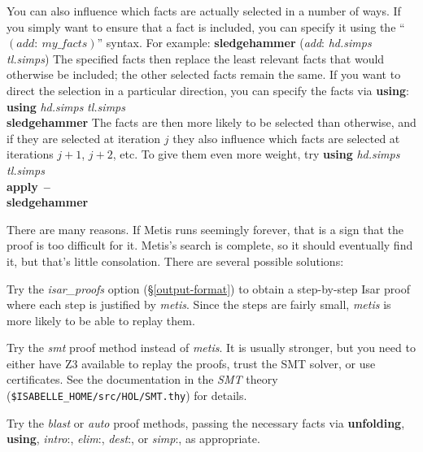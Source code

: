 \documentclass[a4paper,12pt]{article}
\begin{document}
You can also influence which facts are actually selected in a number of ways. If
you simply want to ensure that a fact is included, you can specify it using the
``$(\textit{add}{:}~\textit{my\_facts})$'' syntax. For example:
%
\prew
\textbf{sledgehammer} (\textit{add}: \textit{hd.simps} \textit{tl.simps})
\postw
%
The specified facts then replace the least relevant facts that would otherwise be
included; the other selected facts remain the same.
If you want to direct the selection in a particular direction, you can specify
the facts via \textbf{using}:
%
\prew
\textbf{using} \textit{hd.simps} \textit{tl.simps} \\
\textbf{sledgehammer}
\postw
%
The facts are then more likely to be selected than otherwise, and if they are
selected at iteration $j$ they also influence which facts are selected at
iterations $j + 1$, $j + 2$, etc. To give them even more weight, try
%
\prew
\textbf{using} \textit{hd.simps} \textit{tl.simps} \\
\textbf{apply}~\textbf{--} \\
\textbf{sledgehammer}
\postw


There are many reasons. If Metis runs seemingly forever, that is a sign that the
proof is too difficult for it. Metis's search is complete, so it should
eventually find it, but that's little consolation. There are several possible
solutions:

\begin{enum}
\item[\labelitemi] Try the \textit{isar\_proofs} option (\S\ref{output-format}) to
obtain a step-by-step Isar proof where each step is justified by \textit{metis}.
Since the steps are fairly small, \textit{metis} is more likely to be able to
replay them.

\item[\labelitemi] Try the \textit{smt} proof method instead of \textit{metis}.
It is usually stronger, but you need to either have Z3 available to replay the
proofs, trust the SMT solver, or use certificates. See the documentation in the
\emph{SMT} theory (\texttt{\$ISABELLE\_HOME/src/HOL/SMT.thy}) for details.

\item[\labelitemi] Try the \textit{blast} or \textit{auto} proof methods, passing
the necessary facts via \textbf{unfolding}, \textbf{using}, \textit{intro}{:},
\textit{elim}{:}, \textit{dest}{:}, or \textit{simp}{:}, as appropriate.
\end{enum}
\end{document}
